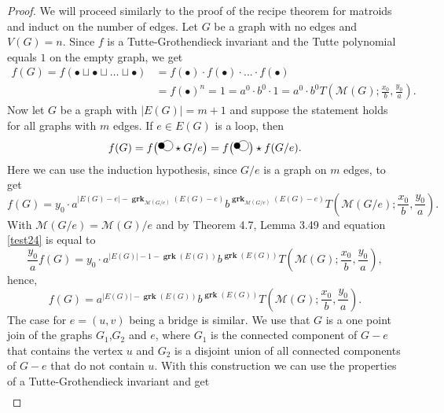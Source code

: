 \documentclass[12pt,a4paper, twoside, autooneside=false]{scrartcl}
\theoremstyle{definition}
\theoremstyle{remark}
\numberwithin{equation}{section}
\newcommand{\M}{\mathcal{M}} %
\DeclareMathOperator{\grk}{\mathbf{grk}} %
\begin{document}
\begin{proof}
We will proceed similarly to the proof of the recipe theorem for matroids and induct on the number of edges. Let $G$ be a graph with no edges and $V(G) = n$. Since $f$ is a Tutte-Grothendieck invariant and the Tutte polynomial equals $1$ on the empty graph, we get 
\begin{align*}
f(G) = f( \bullet \sqcup \bullet \sqcup \dots \sqcup \bullet) &= f(\bullet) \cdot f(\bullet) \cdot ... \cdot f(\bullet) \\ &=  f(\bullet)^n = 1 = a^0 \cdot b^0 \cdot 1 = a^0 \cdot b^0 T\left(\M(G); \frac{x_0}{b}, \frac{y_0}{a}\right).
\end{align*}
Now let $G$ be a graph with $|E(G)| = m + 1$ and suppose the statement holds for all graphs with $m$ edges. If $e \in E(G)$ is a loop, then 
\[
f(G) = f\big( \begin{tikzpicture}
[knoten/.style={circle, draw=black!100, fill=black!100, thick, 
				inner sep=0pt, minimum size=1.75mm}]
		\node at (0,0)[knoten](1){};
        \node (B) at (0.2,0) [circle,draw] {};
\end{tikzpicture} \star G / e\big) 
= f\big(\begin{tikzpicture}
[knoten/.style={circle, draw=black!100, fill=black!100, thick, 
				inner sep=0pt, minimum size=1.75mm}]
		\node at (0,0)[knoten](1){};
        \node (B) at (0.2,0) [circle,draw] {};
\end{tikzpicture}\big) \star f(G/e).
\]
Here we can use the induction hypothesis, since $G/e$ is a graph on $m$ edges, to get 
\begin{equation}\label{test24}
f(G) = y_0 \cdot a^{|E(G) - e| - \grk_{\M(G/e)}(E(G) - e)} b^{\grk_{\M(G / e)}(E(G) - e)}T\left(\M(G / e); \frac{x_0}{b}, \frac{y_0}{a}\right).
\end{equation}
With $\M(G/e) = \M(G) / e$ and by Theorem 4.7, Lemma 3.49 and equation \eqref{test24} is equal to 
\[
\frac{y_0}{a}f(G) = y_0 \cdot a^{|E(G)| - 1- \grk(E(G))}b^{\grk(E(G))}T\left(\M(G); \frac{x_0}{b}, \frac{y_0}{a}\right), 
\]
hence,
\[
f(G) = a^{|E(G)| - \grk(E(G))}b^{\grk(E(G))}T\left(\M(G); \frac{x_0}{b}, \frac{y_0}{a}\right).
\]
The case for $e = (u,v)$ being a bridge is similar. We use that $G$ is a one point join of the graphs $G_1$,$G_2$ and $e$, where $G_1$ is the connected component of $G - e$ that contains the vertex $u$ and $G_2$ is a disjoint union of all connected components of $G - e$ that do not contain $u$. 
With this construction we can use the properties of a Tutte-Grothendieck invariant and get
\begin{align*}

\end{align*}
\end{proof}
\end{document}
